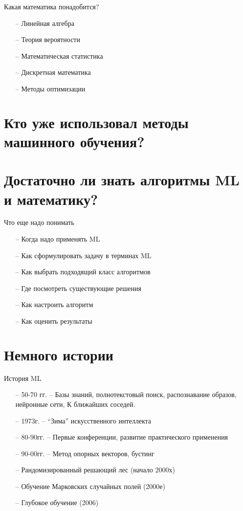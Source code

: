\documentclass[10pt]{beamer}
\begin{document}
\begin{frame}{Какая математика понадобится?}
	\begin{itemize} [<+->]
	  \item[--] Линейная алгебра
	  \item[--] Теория вероятности
	  \item[--] Математическая статистика 
	  \item[--] Дискретная математика
	  	\item[--] Методы оптимизации 
	\end{itemize}
\end{frame}

\section{Кто уже использовал методы машинного обучения? }

\section{Достаточно ли знать алгоритмы ML и математику?}

\begin{frame}{Что еще надо понимать}
	\begin{itemize} [<+->]
	  \item[--] Когда надо применять ML
	  \item[--] Как сформулировать задачу в терминах ML
	  \item[--] Как выбрать подходящий класс алгоритмов
	  \item[--] Где посмотреть существующие решения
	  \item[--] Как настроить алгоритм
	  \item[--] Как оценить результаты
	\end{itemize}
\end{frame}

\section{Немного истории}

\begin{frame}{История ML}
	\begin{itemize} [<+->]
	  \item[--] 50-70 гг. -- Базы знаний, полнотекстовый поиск, распознавание образов, нейронные сети, К ближайших соседей.
	  \item[--] 1973г. -- “Зима” искусственного интеллекта
	  \item[--] 80-90гг.  -- Первые конференции, развитие практического применения
	  \item[--] 90-00гг. -- Метод опорных векторов, бустинг
	  \item[--] Рандомизированный решающий лес (начало 2000х)
	  \item[--] Обучение Марковских случайных полей (2000е)
	  \item[--] Глубокое обучение (2006)
	\end{itemize}
\end{frame}
\end{document}
